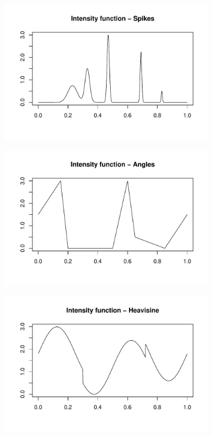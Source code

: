 \documentclass[12pt]{article}
\begin{document}
\begin{figure}
\centering
    \begin{subfigure}[b]{0.48\textwidth}
        \centering
        \includegraphics[width=\textwidth]{pois_sp.pdf}
        \caption{}
        \label{fig:pois_sp}
    \end{subfigure}
		\hfill
    \begin{subfigure}[b]{0.48\textwidth}
        \centering
        \includegraphics[width=\textwidth]{pois_ang.pdf}
        \caption{}
        \label{fig:pois_ang}
    \end{subfigure}
		\hfill
    \begin{subfigure}[b]{0.48\textwidth}
        \centering
        \includegraphics[width=\textwidth]{pois_hs.pdf}

\end{subfigure}
\end{figure}
\end{document}
